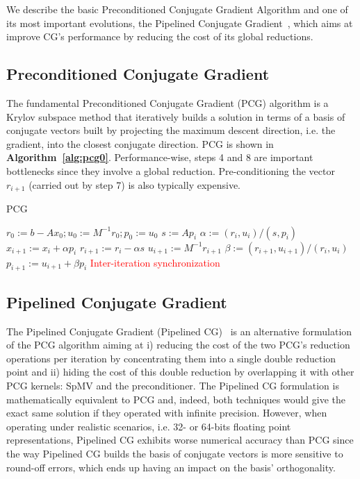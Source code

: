 We describe the basic Preconditioned Conjugate Gradient Algorithm and one of its most important evolutions, the Pipelined Conjugate Gradient~\cite{ghysels14}, 
which aims at improve CG's performance by reducing the cost of its global reductions.

\subsection{Preconditioned Conjugate Gradient}
The fundamental Preconditioned Conjugate Gradient (PCG) algorithm is a Krylov subspace method that iteratively builds a solution in terms of a basis of conjugate vectors built by projecting the maximum descent direction, i.e. the gradient, into the closest conjugate direction.  
PCG is shown in \textbf{Algorithm~\ref{alg:pcg0}}.
Performance-wise, steps 4 and 8 are important bottlenecks since they involve a global reduction.
Pre-conditioning the vector $r_{i+1}$ (carried out by step 7) is also typically expensive.
\begin{algorithm}[H]%
\caption{PCG}
\label{alg:pcg0}
{\fontsize{9}{9}\selectfont
\begin{algorithmic}[1]
	\State $r_{0} := b - Ax_{0}; u_{0} := M^{-1}r_{0}; p_{0} := u_{0}$ 
		\State $s := Ap_{i}$
		\State $\alpha := (r_{i}, u_{i})/(s, p_{i})$
		\State $x_{i+1} := x_{i} + \alpha p_{i}$
		\State $r_{i+1} := r_{i} - \alpha s$
		\State $u_{i+1} := M^{-1}r_{i+1}$
		\State $\beta := (r_{i+1}, u_{i+1})/(r_{i}, u_{i})$
		\State $p_{i+1} := u_{i+1} + \beta p_{i}$
	\EndFor
	\State \textcolor{red} {Inter-iteration synchronization}
\end{algorithmic}
}
\end{algorithm}

\subsection{Pipelined Conjugate Gradient}
\label{sec:ifcg_PreconCG}
The Pipelined Conjugate Gradient (Pipelined CG)~\cite{ghysels14} is an alternative formulation of the PCG algorithm aiming at i) reducing the cost of the two PCG's reduction operations
per iteration by concentrating them into a single double reduction point and ii) hiding the cost of this double reduction by overlapping it with other PCG kernels: SpMV and the preconditioner.
The Pipelined CG formulation is mathematically equivalent to PCG and, 
indeed, both techniques would give the exact same solution if they operated with infinite precision.
However, when operating under realistic scenarios, i.e. 32- or 64-bits floating point representations, Pipelined CG exhibits worse numerical accuracy than PCG since the way Pipelined CG builds the basis of conjugate vectors is more sensitive to round-off errors, which ends up having an impact on the basis' orthogonality.


